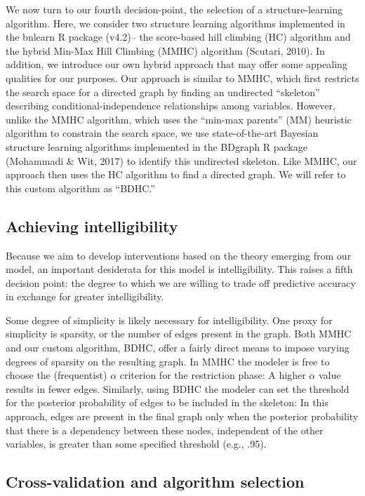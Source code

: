 \documentclass[10pt, letterpaper]{article}
\begin{document}
We now turn to our fourth decision-point, the selection of a
structure-learning algorithm. Here, we consider two structure learning
algorithms implemented in the bnlearn R package (v4.2)-- the score-based
hill climbing (HC) algorithm and the hybrid Min-Max Hill Climbing (MMHC)
algorithm (Scutari, 2010). In addition, we introduce our own hybrid
approach that may offer some appealing qualities for our purposes. Our
approach is similar to MMHC, which first restricts the search space for
a directed graph by finding an undirected ``skeleton'' describing
conditional-independence relationships among variables. However, unlike
the MMHC algorithm, which uses the ``min-max parents'' (MM) heuristic
algorithm to constrain the search space, we use state-of-the-art
Bayesian structure learning algorithms implemented in the BDgraph R
package (Mohammadi \& Wit, 2017) to identify this undirected skeleton.
Like MMHC, our approach then uses the HC algorithm to find a directed
graph. We will refer to this custom algorithm as ``BDHC.''

\subsection{Achieving intelligibility}\label{achieving-intelligibility}

Because we aim to develop interventions based on the theory emerging
from our model, an important desiderata for this model is
intelligibility. This raises a fifth decision point: the degree to which
we are willing to trade off predictive accuracy in exchange for greater
intelligibility.

Some degree of simplicity is likely necessary for intelligibility. One
proxy for simplicity is sparsity, or the number of edges present in the
graph. Both MMHC and our custom algorithm, BDHC, offer a fairly direct
means to impose varying degrees of sparsity on the resulting graph. In
MMHC the modeler is free to choose the (frequentist) \(\alpha\)
criterion for the restriction phase: A higher \(\alpha\) value results
in fewer edges. Similarly, using BDHC the modeler can set the threshold
for the posterior probability of edges to be included in the skeleton:
In this approach, edges are present in the final graph only when the
posterior probability that there is a dependency between these nodes,
independent of the other variables, is greater than some specified
threshold (e.g., .95).

\subsection{Cross-validation and algorithm
selection}\label{cross-validation-and-algorithm-selection}
\end{document}
